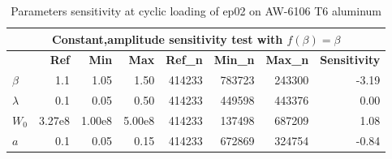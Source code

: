 \begin{table}[!h]
	\centering
	\begin{tabular}{lrrrrrrr}
		\hline
		\multicolumn{8}{c}{\textbf{Constant,amplitude sensitivity test with $f(\beta)=\beta$}}                                                                                                                                                                                                                                           \\ \hline
		& \multicolumn{1}{r}{\textbf{Ref}} & \multicolumn{1}{r}{\textbf{Min}} & \multicolumn{1}{r}{\textbf{Max}} & \multicolumn{1}{r}{\textbf{Ref\_n}} & \multicolumn{1}{r}{\textbf{Min\_n}} & \multicolumn{1}{r}{\textbf{Max\_n}} & \multicolumn{1}{r}{\textbf{Sensitivity}} \\ \hline
		\textbf{$\beta$}   & 1.1                                          & 1.05                             & 1.50                             & 414233                                     & 
		783723 	                              & 243300 
		&-3.19 
		\\
		\textbf{$\lambda$} & 0.1                                          & 0.05                             & 0.50                             & 414233                                    & 449598 
		& 443376 
		& 0.00                                    \\
		\textbf{$W_0$}     & 3.27e8                                     & 1.00e8                         & 5.00e8                         & 414233                                     & 137498 
		& 687209 
		& 1.08                                    \\
		\textbf{$a$}       & 0.1                                          & 0.05                             & 0.15                             & 414233                                  & 672869 
		& 324754 
		& -0.84                                   \\ \hline
	\end{tabular}
	\caption{Parameters sensitivity at cyclic loading of ep02 on AW-6106 T6 aluminum}
	\label{tab.sensitivity_const1}
\end{table}

\clearpage
